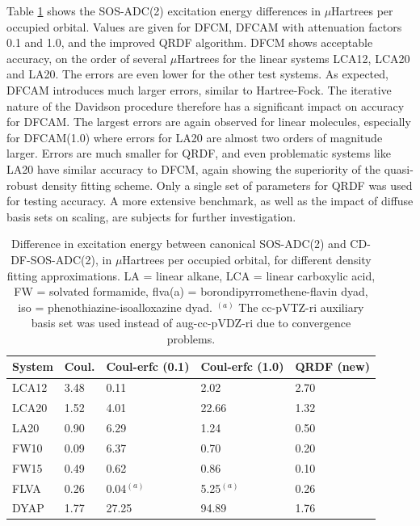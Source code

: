 Table \ref{tab:ES_ACCURACY} shows the SOS-ADC(2) excitation energy differences in $\mu$Hartrees per occupied orbital. Values are given for DFCM, DFCAM with attenuation factors 0.1 and 1.0, and the improved QRDF algorithm. DFCM shows acceptable accuracy, on the order of several $\mu$Hartrees for the linear systems LCA12, LCA20 and LA20. The errors are even lower for the other test systems. As expected, DFCAM introduces much larger errors, similar to Hartree-Fock. The iterative nature of the Davidson procedure therefore has a significant impact on accuracy for DFCAM. The largest errors are again observed for linear molecules, especially for DFCAM(1.0) where errors for LA20 are almost two orders of magnitude larger. Errors are much smaller for QRDF, and even problematic systems like LA20 have similar accuracy to DFCM, again showing the superiority of the quasi-robust density fitting scheme. Only a single set of parameters for QRDF was used for testing accuracy. A more extensive benchmark, as well as the impact of diffuse basis sets on scaling, are subjects for further investigation.


\begin{table}
\centering
\begin{tabular}{lllll}
\hline
System & Coul. & Coul-erfc (0.1) & Coul-erfc (1.0) & QRDF (new) \\
\hline
LCA12	& 3.48	& 0.11	& 2.02	& 2.70 \\
LCA20	& 1.52	& 4.01	& 22.66	& 1.32 \\
LA20	 & 0.90	& 6.29	& 1.24	& 0.50 \\
FW10	 & 0.09	& 6.37	& 0.70	& 0.20 \\
FW15	 & 0.49	& 0.62	& 0.86	& 0.10 \\
FLVA	 & 0.26	& 0.04$^{(a)}$	& 5.25$^{(a)}$	& 0.26 \\
DYAP	 & 1.77	& 27.25	& 94.89	& 1.76 \\
\hline
\end{tabular}
\label{tab:ES_ACCURACY}
\caption{Difference in excitation energy between canonical SOS-ADC(2) and CD-DF-SOS-ADC(2), in $\mu$Hartrees per occupied orbital, for different density fitting approximations. LA = linear alkane, LCA = linear carboxylic acid, FW = solvated formamide, flva(a) = borondipyrromethene-flavin dyad, iso = phenothiazine-isoalloxazine dyad. $^{(a)}$ The cc-pVTZ-ri auxiliary basis set was used instead of aug-cc-pVDZ-ri due to convergence problems.}
\end{table}

